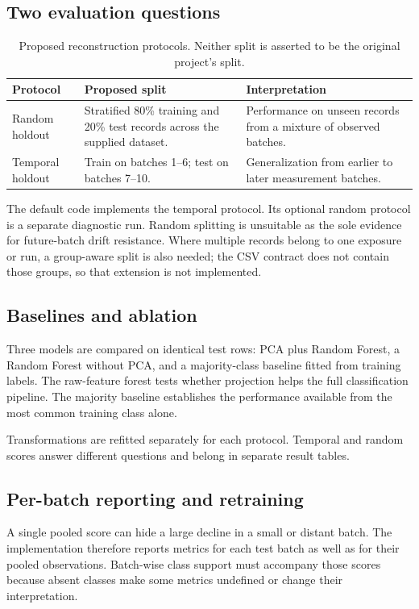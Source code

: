 \documentclass[11pt,a4paper]{article}
\begin{document}
\subsection{Two evaluation questions}
\begin{table}[h!]\centering\small
\begin{tabularx}{\textwidth}{@{}lXX@{}}\toprule
Protocol & Proposed split & Interpretation\\\midrule
Random holdout & Stratified 80\% training and 20\% test records across the supplied dataset. & Performance on unseen records from a mixture of observed batches.\\
Temporal holdout & Train on batches 1--6; test on batches 7--10. & Generalization from earlier to later measurement batches.\\\bottomrule
\end{tabularx}
\caption{Proposed reconstruction protocols. Neither split is asserted to be the original project's split.}
\end{table}
The default code implements the temporal protocol. Its optional random protocol is a separate diagnostic run. Random splitting is unsuitable as the sole evidence for future-batch drift resistance. Where multiple records belong to one exposure or run, a group-aware split is also needed; the CSV contract does not contain those groups, so that extension is not implemented.

\subsection{Baselines and ablation}
Three models are compared on identical test rows: PCA plus Random Forest, a Random Forest without PCA, and a majority-class baseline fitted from training labels. The raw-feature forest tests whether projection helps the full classification pipeline. The majority baseline establishes the performance available from the most common training class alone.

Transformations are refitted separately for each protocol. Temporal and random scores answer different questions and belong in separate result tables.

\subsection{Per-batch reporting and retraining}
A single pooled score can hide a large decline in a small or distant batch. The implementation therefore reports metrics for each test batch as well as for their pooled observations. Batch-wise class support must accompany those scores because absent classes make some metrics undefined or change their interpretation.
\end{document}
